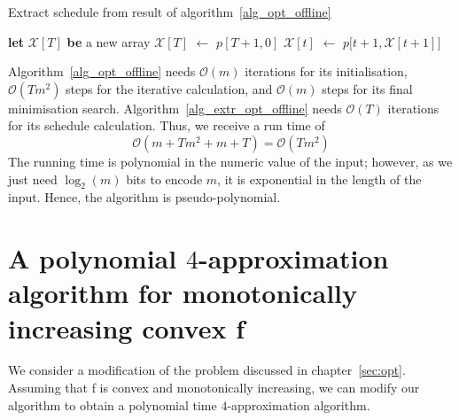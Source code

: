 \documentclass[hidelinks]{article}
\newcommand\Let[2]{\State #1 $\gets$ #2}
\newcommand\Blet[2]{\State \textbf{let} #1 \textbf{be} #2}
\theoremstyle{plain}
\theoremstyle{definition}
\theoremstyle{rem}
\newcommand{\mx}{\mathcal{X}}
\begin{document}
\begin{algorithm}[H]
    \caption{Extract schedule from result of algorithm~\ref{alg_opt_offline}}
    \begin{algorithmic}[1]
	\Blet{$\mx[T]$}{a new array}
    	\Let{$\mx[T]$}{$p[T+1,0]$}
		\Let{$\mx[t]$}{$p\bigl[t+1,\mx[t+1]\bigr]$}
	\EndFor
	\State \Return{$\mx$}
  \EndFunction
  \end{algorithmic}
  \label{alg_extr_opt_offline}
\end{algorithm}
Algorithm~\ref{alg_opt_offline} needs $\mathcal{O}(m)$ iterations for its initialisation, $\mathcal{O}(Tm^2)$ steps for the iterative calculation, and $\mathcal{O}(m)$ steps for its final minimisation search. Algorithm~\ref{alg_extr_opt_offline} needs $\mathcal{O}(T)$ iterations for its schedule calculation. Thus, we receive a run time of 
\begin{equation*}
	\mathcal{O}(m+Tm^2+m+T)=\mathcal{O}(Tm^2)
\end{equation*}
The running time is polynomial in the numeric value of the input; however, as we just need $\log_2(m)$ bits to encode $m$, it is exponential in the length of the input. Hence, the algorithm is pseudo-polynomial.

\section{A polynomial $4$-approximation algorithm for monotonically increasing convex f}
We consider a modification of the problem discussed in chapter~\ref{sec:opt}. Assuming that f is convex and monotonically increasing, we can modify our algorithm to obtain a polynomial time $4$-approximation algorithm.
\end{document}
